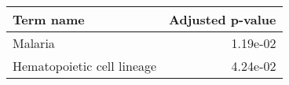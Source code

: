 \begin{tabular}{lr}
\toprule
                 Term name &  Adjusted p-value \\
\midrule
                   Malaria &          1.19e-02 \\
Hematopoietic cell lineage &          4.24e-02 \\
\bottomrule
\end{tabular}
